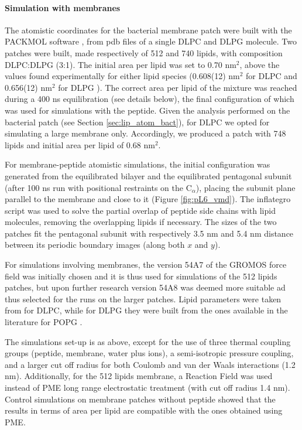 \paragraph{Simulation with membranes} The atomistic coordinates for the bacterial membrane patch were built with the PACKMOL software \citep{Martinez2009}, from pdb files of a single DLPC \citep{PogerOrig} and DLPG \citep{Kukol2009} molecule. Two patches were built, made respectively of 512 and 740 lipids, with composition DLPC:DLPG (3:1). The initial area per lipid was set to 0.70 nm$^2$, above the values found experimentally for either lipid species (0.608(12) nm$^2$ for DLPC \citep{Kucerka2011} and 0.656(12) nm$^2$ for DLPG \citep{Pan2012}). The correct area per lipid of the mixture was reached during a 400 ns equilibration (see details below), the final configuration of which was used for simulations with the peptide.
Given the analysis performed on the bacterial patch (see Section \ref{sec:lip_atom_bact}), for DLPC we opted for simulating a large membrane only. Accordingly, we produced a patch with 748 lipids and initial area per lipid of 0.68 nm$^2$.

For membrane-peptide atomistic simulations, the initial configuration was generated from the equilibrated bilayer and the equilibrated pentagonal subunit (after 100 ns run with positional restraints on the C$_\alpha$), placing the subunit plane parallel to the membrane and close to it (Figure \ref{fig:pL6_vmd}).
%
The inflategro script \citep{Kandt2007} was used to solve the partial overlap of peptide side chains with lipid molecules, removing the overlapping lipids if necessary.
%
The sizes of the two patches fit the pentagonal subunit with respectively 3.5 nm and 5.4 nm distance between its periodic boundary images (along both $x$ and $y$).

For simulations involving membranes, the version 54A7 of the GROMOS force field \citep{Schmid2011} was initially chosen and it is thus used for simulations of the 512 lipids patches, but upon further research version 54A8 \citep{Oostenbrink2005, Reif2013} was deemed more suitable ad thus selected for the runs on the larger patches. Lipid parameters were taken from \citep{PogerOrig} for DLPC, while for DLPG they were built from the ones available in the literature for POPG \citep{Kukol2009}.

The simulations set-up is as above, except for the use of three thermal coupling groups (peptide, membrane, water plus ions), a semi-isotropic pressure coupling, and a larger cut off radius for both Coulomb and van der Waals interactions (1.2 nm). Additionally, for the 512 lipids membrane, a Reaction Field \citep{Tironi1995} was used instead of PME long range electrostatic treatment (with cut off radius 1.4 nm). Control simulations on membrane patches without peptide showed that the results in terms of area per lipid are compatible with the ones obtained using PME.

